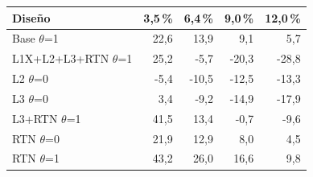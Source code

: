 \begin{tabular}{p{4.6cm}rrrr}
\toprule
Diseño & 3,5\,\% & 6,4\,\% & 9,0\,\% & 12,0\,\% \\
\midrule
Base \textbar{} $\theta$=1 & 22,6 & 13,9 & 9,1 & 5,7 \\
L1X+\allowbreak{}L2+\allowbreak{}L3+\allowbreak{}RTN \textbar{} $\theta$=1 & 25,2 & -5,7 & -20,3 & -28,8 \\
L2 \textbar{} $\theta$=0 & -5,4 & -10,5 & -12,5 & -13,3 \\
L3 \textbar{} $\theta$=0 & 3,4 & -9,2 & -14,9 & -17,9 \\
L3+\allowbreak{}RTN \textbar{} $\theta$=1 & 41,5 & 13,4 & -0,7 & -9,6 \\
RTN \textbar{} $\theta$=0 & 21,9 & 12,9 & 8,0 & 4,5 \\
RTN \textbar{} $\theta$=1 & 43,2 & 26,0 & 16,6 & 9,8 \\
\bottomrule
\end{tabular}
